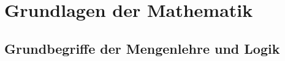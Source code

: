 \documentclass[ngerman,a4paper]{report}
\theoremstyle{changebreak}
\begin{document}
\chapter{Grundlagen der Mathematik}
\setcounter{section}{1}
\section{Grundbegriffe der Mengenlehre und Logik}


\printindex
\end{document}
